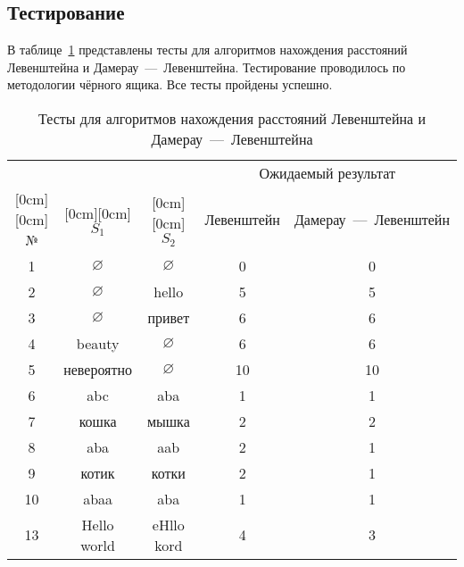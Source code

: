 \subsection{Тестирование}

В таблице~\ref{table:tests} представлены тесты для алгоритмов нахождения расстояний Левенштейна и Дамерау~---~Левенштейна. Тестирование проводилось по методологии чёрного ящика. Все тесты пройдены успешно.

\begin{table}[htb]
\caption{\centering Тесты для алгоритмов нахождения расстояний Левенштейна и Дамерау~---~Левенштейна}
\small
\centering\begin{tabular}{|c|c|c|c|c|}
      \hline
       &  &  & \multicolumn{2}{c|}{Ожидаемый результат} \\
      \cline{4-5}
      \raisebox{1.5ex}[0cm][0cm]{№} & \raisebox{1.5ex}[0cm][0cm]{$S_1$} & \raisebox{1.5ex}[0cm][0cm]{$S_2$} 
      &  Левенштейн & Дамерау~---~Левенштейн \\ \hline
      1 & $\varnothing$ & $\varnothing$ & 0 & 0 \\ \hline
      2 & $\varnothing$ & hello & 5 & 5 \\ \hline
      3 & $\varnothing$ & привет & 6 & 6 \\ \hline
      4 & beauty & $\varnothing$ & 6 & 6 \\ \hline
      5 & невероятно & $\varnothing$ & 10 & 10 \\ \hline
      6 & abc & aba & 1 & 1 \\ \hline
      7 & кошка & мышка & 2 & 2 \\ \hline
      8 & aba & aab & 2 & 1 \\ \hline
      9 & котик & котки & 2 & 1 \\ \hline
      10 & abaa & aba & 1 & 1 \\ \hline
      13 & Hello world & eHllo kord & 4 & 3 \\ \hline
    \end{tabular}
\label{table:tests}
\end{table}
